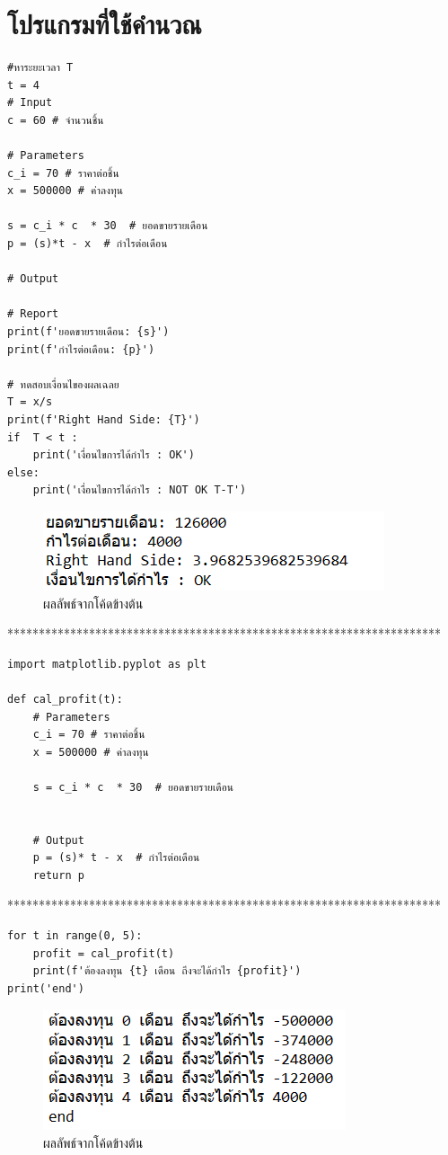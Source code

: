\documentclass{report}
\begin{document}
\section{โปรแกรมที่ใช้คำนวณ}
\begin{verbatim}
#หาระยะเวลา T
t = 4
# Input
c = 60 # จำนวนชิ้น

# Parameters
c_i = 70 # ราคาต่อชิ้น
x = 500000 # ค่าลงทุน

s = c_i * c  * 30  # ยอดขายรายเดือน
p = (s)*t - x  # กำไรต่อเดือน

# Output

# Report
print(f'ยอดขายรายเดือน: {s}')
print(f'กำไรต่อเดือน: {p}')

# ทดสอบเงื่อนไของผลเฉลย
T = x/s
print(f'Right Hand Side: {T}')
if  T < t :
    print('เงื่อนไขการได้กำไร : OK')
else:
    print('เงื่อนไขการได้กำไร : NOT OK T-T')
\end{verbatim}
\raggedright\begin{figure}[!ht]
    \centering
    \includegraphics[scale=0.85]{A1.png}
    \caption{ผลลัพธ์จากโค้ดข้างต้น} 
\label{fig:mesh1}
\end{figure} 
*********************************************************************
\begin{verbatim}
import matplotlib.pyplot as plt

def cal_profit(t):
    # Parameters
    c_i = 70 # ราคาต่อชิ้น
    x = 500000 # ค่าลงทุน

    s = c_i * c  * 30  # ยอดขายรายเดือน


    # Output
    p = (s)* t - x  # กำไรต่อเดือน
    return p
\end{verbatim}
*********************************************************************
\begin{verbatim}
for t in range(0, 5):
    profit = cal_profit(t) 
    print(f'ต้องลงทุน {t} เดือน ถึงจะได้กำไร {profit}')
print('end')
\end{verbatim}
\begin{figure}[!ht]
    \centering
    \includegraphics[scale=0.85]{A2.png}
    \caption{ผลลัพธ์จากโค้ดข้างต้น} 
\label{fig:mesh2}
\end{figure}
\end{document}
